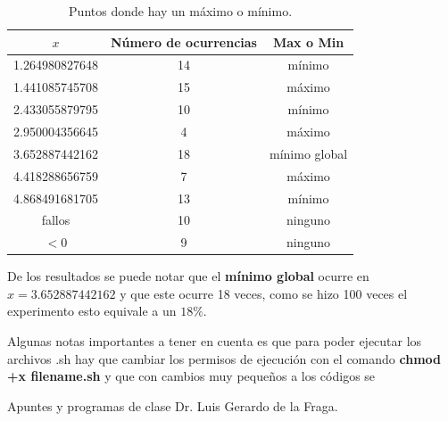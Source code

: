 \documentclass[10pt,a4paper]{article}
\begin{document}
\begin{table}[!hbp]                                 
		\centering                                       
		\begin{tabular}{ccc}
			\hline                                             
			$x$ & Número de ocurrencias & Max o Min \\                     
			\hline 
			1.264980827648 & 14	& mínimo\\                                            
			1.441085745708 & 15	& máximo\\
			2.433055879795 & 10	& mínimo\\
			2.950004356645 & 4	& máximo\\
			3.652887442162 & 18	& mínimo global\\
			4.418288656759 & 7	& máximo\\
			4.868491681705 & 13	& mínimo\\
			fallos         & 10	& ninguno\\
			$<0$		   & 9	& ninguno\\
			\hline                                             
		\end{tabular}
		\caption{Puntos donde hay un máximo o mínimo.}                                                                                  
	\end{table}	

De los resultados se puede notar que el \textbf{mínimo global} ocurre en $x = 3.652887442162$ y que este ocurre 18 veces, como se hizo 100 veces el experimento esto equivale a un $18\%$.

Algunas notas importantes a tener en cuenta es que para poder ejecutar los archivos .sh hay que cambiar los permisos de ejecución con el comando \textbf{chmod +x filename.sh} y que con cambios muy pequeños a los códigos se 


\newpage








\begin{thebibliography}{99}
 Apuntes y programas de clase Dr. Luis Gerardo de la Fraga.
\end{thebibliography}
\end{document}
